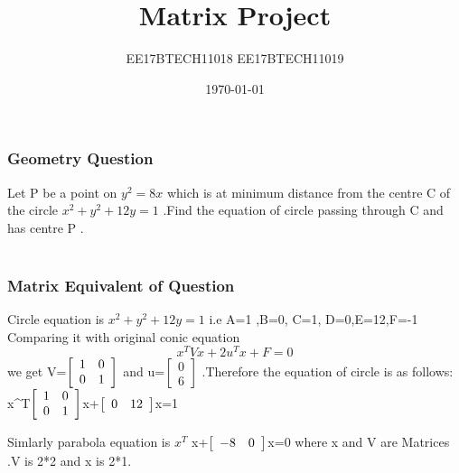 \documentclass{beamer}
\title[Short title]{Matrix Project } %
\author{EE17BTECH11018 \newline EE17BTECH11019} %
\institute[IIT Hyderabad] %
{
IIT Hyderabad \\ %
\medskip
\textit{EE 1390-INTRO to AI and ML} 
}
\date{\today} %
\begin{document}
\begin{frame}
\titlepage %
\end{frame}




\begin{frame}
\frametitle{Geometry Question}
Let P be a point on $ y^2=8x $ which is at minimum distance from the centre C of the circle $x^2+y^2+12y=1$ .Find the equation of circle passing through C and has centre P  .\\~\\


\end{frame}


\begin{frame}
\frametitle{Matrix Equivalent of Question}
Circle equation is  $x^2+y^2+12y=1$ i.e A=1 ,B=0, C=1, D=0,E=12,F=-1
Comparing it with original conic equation $$x^TVx+2u^Tx+F=0$$
we get V=$ \left[ 
  \begin{array}{ c c }
     1& 0\\
     0 & 1
  \end{array} \right]
$ and u=$ \left[
  \begin{array}{ c }
     0 \\
     6
  \end{array} \right]
$ .Therefore  the equation of circle is as follows:
x^T$ \left[
  \begin{array}{ c c }
     1 & 0 \\
     0& 1
  \end{array} \right]
$x+$ \left[
  \begin{array}{ c c }
     0 & 12 \\
     
  \end{array} \right]
$x=1

Simlarly parabola equation is $x^T$ \left[
  \begin{array}{ c c }
     0 & 0\\
     0 & 1
  \end{array} \right]
x+$ \left[
  \begin{array}{ c c }
     -8&0 \\
    
  \end{array} \right]
$x=0
where x and V are Matrices .V is 2*2 and x is 2*1.

\end{frame}
\end{document}
